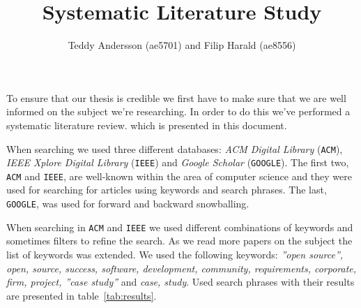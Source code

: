 \documentclass[11pt, oneside]{article}   	%
\title{Systematic Literature Study}
\author{Teddy Andersson (ae5701) and Filip Harald (ae8556)}
\begin{document}
\maketitle
\newpage
To ensure that our thesis is credible we first have to make sure that we are well informed on the subject we're researching. In order to do this we've performed a systematic literature review. which is presented in this document.

When searching we used three different databases: \emph{ACM Digital Library} (\texttt{ACM}), \emph{IEEE Xplore Digital Library} (\texttt{IEEE}) and \emph{Google Scholar} (\texttt{GOOGLE}). The first two, \texttt{ACM} and \texttt{IEEE}, are well-known within the area of computer science and they were used for searching for articles using keywords and search phrases. The last, \texttt{GOOGLE}, was used for forward and backward snowballing.

When searching in \texttt{ACM} and \texttt{IEEE} we used different combinations of keywords and sometimes filters to refine the search. As we read more papers on the subject the list of keywords was extended. We used the following keywords: \emph{''open source'', open, source, success, software, development, community, requirements, corporate, firm, project, ''case study''} and \emph{case, study}. Used search phrases with their results are presented in table~\ref{tab:results}.
\end{document}
